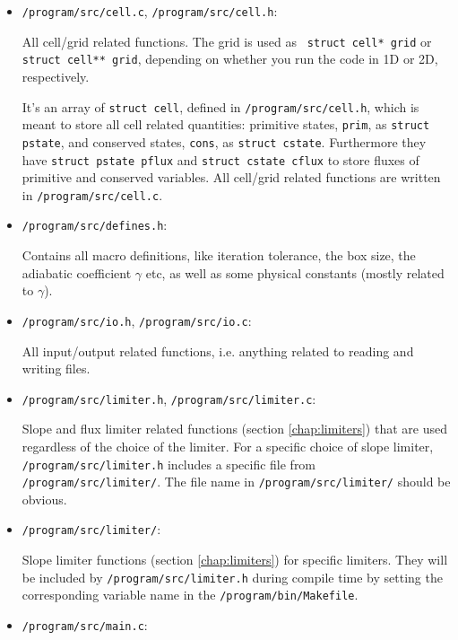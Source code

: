\begin{itemize}
	\item 	\texttt{/program/src/cell.c}, \texttt{/program/src/cell.h}: 
	
			All cell/grid related functions.
			The grid is used as \texttt{ struct cell* grid} or \texttt{struct cell** grid}, depending on whether you run the code in 1D or 2D, respectively.

			It's an array of \texttt{struct cell}, defined in \texttt{/program/src/cell.h}, which is meant to store all cell related quantities: primitive states, \texttt{prim}, as  \texttt{struct pstate}, and conserved states, \texttt{cons}, as \texttt{struct cstate}.
			Furthermore they have \texttt{struct pstate pflux} and \texttt{struct cstate cflux} to store fluxes of primitive and conserved variables.
			All cell/grid related functions are written in \texttt{/program/src/cell.c}.	
			

	\item 	\texttt{/program/src/defines.h}:
	
			Contains all macro definitions, like iteration tolerance, the box size, the adiabatic coefficient $\gamma$ etc, as well as some physical constants (mostly related to $\gamma$).
			
	\item 	\texttt{/program/src/io.h}, \texttt{/program/src/io.c}:
	
			All input/output related functions, i.e. anything related to reading and writing files.
			
	\item 	\texttt{/program/src/limiter.h}, \texttt{/program/src/limiter.c}:
	
			Slope and flux limiter related functions (section \ref{chap:limiters}) that are used regardless of the choice of the limiter.
			For a specific choice of slope limiter, \texttt{/program/src/limiter.h} includes a specific file from \texttt{/program/src/limiter/}.
			The file name in \texttt{/program/src/limiter/} should be obvious.
			
	\item 	\texttt{/program/src/limiter/}:
	
			Slope limiter functions (section \ref{chap:limiters}) for specific limiters.
			They will be included by \texttt{/program/src/limiter.h} during compile time by setting the corresponding variable name in the \texttt{/program/bin/Makefile}.
			
			
	\item 	\texttt{/program/src/main.c}:
			

\end{itemize}
